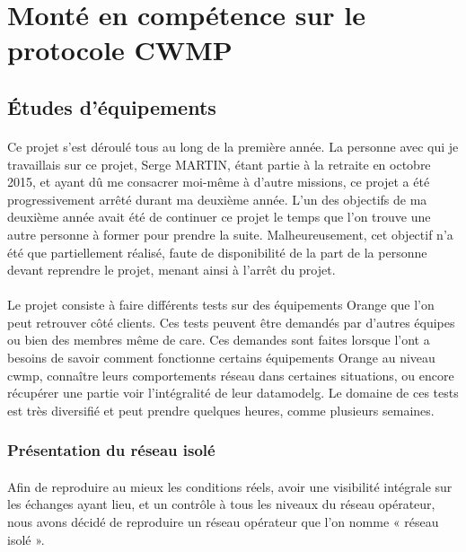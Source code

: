\documentclass[12pt,a4paper]{report}
\begin{document}
\newpage
\section{Monté en compétence sur le protocole CWMP}
\subsection{Études d'équipements}
\paragraph*{}Ce projet s'est déroulé tous au long de la première année. La personne avec qui je travaillais sur ce projet, Serge MARTIN, étant partie à la retraite en octobre 2015, et ayant dû me consacrer moi-même à d'autre missions, ce projet a été progressivement arrêté durant ma deuxième année. L'un des objectifs de ma deuxième année avait été de continuer ce projet le temps que l'on trouve une autre personne à former pour prendre la suite. Malheureusement, cet objectif n'a été que partiellement réalisé, faute de disponibilité de la part de la personne devant reprendre le projet, menant ainsi à l'arrêt du projet.
\paragraph*{}Le projet consiste à faire différents tests sur des équipements Orange que l’on peut retrouver côté clients. Ces tests peuvent être demandés par d'autres équipes ou bien des membres même de \gls{care}. Ces demandes sont faites lorsque l'ont a besoins de savoir comment fonctionne certains équipements Orange au niveau \gls{cwmp}, connaître leurs comportements réseau dans certaines situations, ou encore récupérer une partie voir l'intégralité de leur \gls{datamodelg}. Le domaine de ces tests est très diversifié et peut prendre quelques heures, comme plusieurs semaines. \\
\subsubsection{Présentation du réseau isolé}
\paragraph*{}Afin de reproduire au mieux les conditions réels, avoir une visibilité intégrale sur les échanges ayant lieu, et un contrôle à tous les niveaux du réseau opérateur, nous avons décidé de reproduire un réseau opérateur que l’on nomme « réseau isolé ». 
\end{document}
